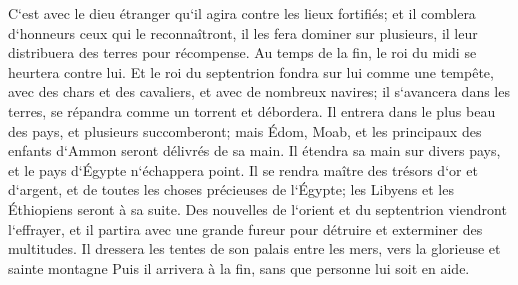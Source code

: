 \verse C`est avec le dieu étranger qu`il agira contre les lieux fortifiés; et il comblera d`honneurs ceux qui le reconnaîtront, il les fera dominer sur plusieurs, il leur distribuera des terres pour récompense. 
\verse Au temps de la fin, le roi du midi se heurtera contre lui. Et le roi du septentrion fondra sur lui comme une tempête, avec des chars et des cavaliers, et avec de nombreux navires; il s`avancera dans les terres, se répandra comme un torrent et débordera. 
\verse Il entrera dans le plus beau des pays, et plusieurs succomberont; mais Édom, Moab, et les principaux des enfants d`Ammon seront délivrés de sa main. 
\verse Il étendra sa main sur divers pays, et le pays d`Égypte n`échappera point. 
\verse Il se rendra maître des trésors d`or et d`argent, et de toutes les choses précieuses de l`Égypte; les Libyens et les Éthiopiens seront à sa suite. 
\verse Des nouvelles de l`orient et du septentrion viendront l`effrayer, et il partira avec une grande fureur pour détruire et exterminer des multitudes. 
\verse Il dressera les tentes de son palais entre les mers, vers la glorieuse et sainte montagne Puis il arrivera à la fin, sans que personne lui soit en aide. 

